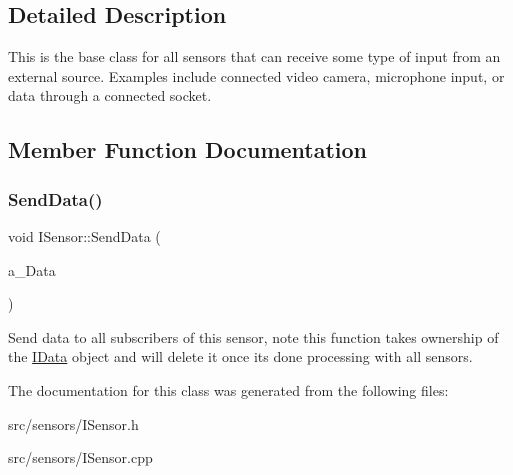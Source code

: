 \subsection{Detailed Description}
This is the base class for all sensors that can receive some type of input from an external source. Examples include connected video camera, microphone input, or data through a connected socket. 

\subsection{Member Function Documentation}
\mbox{\label{class_i_sensor_a00503f0e5633a03835715a2a74efe5a7}} 
\subsubsection{\texorpdfstring{Send\+Data()}{SendData()}}
{\footnotesize\ttfamily void I\+Sensor\+::\+Send\+Data (\begin{DoxyParamCaption}\item[{\hyperlink{class_i_data}{I\+Data} $\ast$}]{a\+\_\+\+Data }\end{DoxyParamCaption})\hspace{0.3cm}{\ttfamily [protected]}}

Send data to all subscribers of this sensor, note this function takes ownership of the \hyperlink{class_i_data}{I\+Data} object and will delete it once it\textquotesingle{}s done processing with all sensors. 

The documentation for this class was generated from the following files\+:\begin{DoxyCompactItemize}
\item 
src/sensors/I\+Sensor.\+h\item 
src/sensors/I\+Sensor.\+cpp\end{DoxyCompactItemize}
